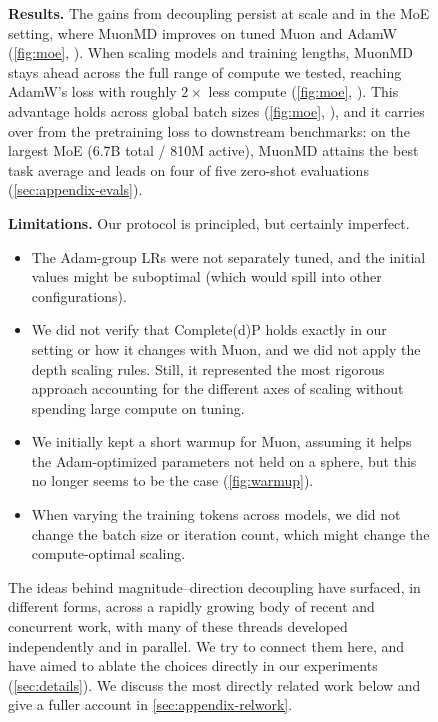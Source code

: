 \documentclass[10pt]{article} %
\makeatletter
\def\section{\@startsection{section}{1}{\z@}{-2.0ex plus -0.5ex minus -.2ex}{1.0ex plus 0.2ex minus 0.1ex}{\large\bf\raggedright\sffamily}}
\makeatother
\begin{document}
\begin{figure}[t]
\textbf{Results.} The gains from decoupling persist at scale and in the MoE setting, where MuonMD improves on tuned Muon and AdamW (\autoref{fig:moe}, \panelleft). When scaling models and training lengths, MuonMD stays ahead across the full range of compute we tested, reaching AdamW's loss with roughly $2\times$ less compute (\autoref{fig:moe}, \panelcenter). This advantage holds across global batch sizes (\autoref{fig:moe}, \panelright), and it carries over from the pretraining loss to downstream benchmarks: on the largest MoE (6.7B total / 810M active), MuonMD attains the best task average and leads on four of five zero-shot evaluations (\autoref{sec:appendix-evals}).

\textbf{Limitations.} Our protocol is principled, but certainly imperfect.
\begin{itemize}
\item The Adam-group LRs were not separately tuned, and the initial values might be suboptimal (which would spill into other configurations).
\item We did not verify that Complete(d)P holds exactly in our setting or how it changes with Muon, and we did not apply the depth scaling rules. Still, it represented the most rigorous approach accounting for the different axes of scaling without spending large compute on tuning.
\item We initially kept a short warmup for Muon, assuming it helps the Adam-optimized parameters not held on a sphere, but this no longer seems to be the case (\autoref{fig:warmup}).
\item When varying the training tokens across models, we did not change the batch size or iteration count, which might change the compute-optimal scaling.
\end{itemize}

\section{Related Work}
\label{sec:related}

The ideas behind magnitude--direction decoupling have surfaced, in different forms, across a rapidly growing body of recent and concurrent work, with many of these threads developed independently and in parallel. We try to connect them here, and have aimed to ablate the choices directly in our experiments (\autoref{sec:details}). We discuss the most directly related work below and give a fuller account in \autoref{sec:appendix-relwork}.


\end{figure}
\end{document}
